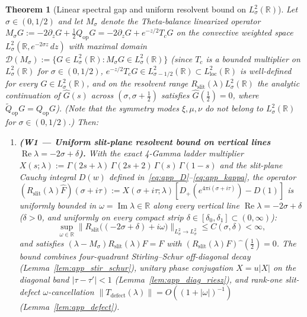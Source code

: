 \documentclass[11pt,a4paper]{article}
\newtheorem{thm}{Theorem}
\begin{document}
\begin{thm}[Linear spectral gap and uniform resolvent bound on $L^2_\sigma(\mathbb{R})$]
\label{thm:linear_gap}
Let $\sigma\in(0,1/2)$ and let $M_\sigma$ denote the Theta-balance linearized operator
$M_\sigma G := -2\partial_z G + \tfrac12 Q_{\mathrm{op}}G = -2\partial_z G + e^{-z/2}T_c G$
on the convective weighted space $L^2_\sigma(\mathbb{R}, e^{-2\sigma z}\,dz)$ with maximal domain
$\mathcal{D}(M_\sigma) := \{G\in L^2_\sigma(\mathbb{R}) : M_\sigma G\in L^2_\sigma(\mathbb{R})\}$
(since $T_c$ is a bounded multiplier on $L^2_\sigma(\mathbb{R})$ for $\sigma\in(0,1/2)$,
$e^{-z/2}T_c G\in L^2_{\sigma-1/2}(\mathbb{R})\subset L^2_{\mathrm{loc}}(\mathbb{R})$ is well-defined for every
$G\in L^2_\sigma(\mathbb{R})$, and on the resolvent range $R_{\mathrm{slit}}(\lambda)L^2_\sigma(\mathbb{R})$
the analytic continuation of $\widehat{G}(s)$ across $(\sigma,\sigma+\tfrac12)$ satisfies
$\widehat{G}(\tfrac12)=0$, where $\widetilde{Q}_{\mathrm{op}}G=Q_{\mathrm{op}}G$).
(Note that the symmetry modes $\xi,\mu,\nu$ do not belong to $L^2_\sigma(\mathbb{R})$ for
$\sigma\in(0,1/2)$.)  Then:
\begin{enumerate}
\item \textbf{(W1 --- Uniform slit-plane resolvent bound on vertical lines $\operatorname{Re}\lambda = -2\sigma+\delta$).}
  With the exact 4-Gamma ladder multiplier
  $X(s;\lambda) := \Gamma(2s+\lambda)\,\Gamma(2s+2)\,\Gamma(s)\,\Gamma(1-s)$
  and the slit-plane Cauchy integral $D(w)$ defined in~\eqref{eq:app_D}--\eqref{eq:app_kappa},
  the operator
  $(R_{\mathrm{slit}}(\lambda)\widehat{F})(\sigma+i\tau) := X(\sigma+i\tau;\lambda)[D_+(e^{4\pi i(\sigma+i\tau)})-D(1)]$
  is uniformly bounded in $\omega=\operatorname{Im}\lambda\in\mathbb{R}$ along every vertical line
  $\operatorname{Re}\lambda = -2\sigma+\delta$ ($\delta>0$, and uniformly on every compact strip
  $\delta\in[\delta_0,\delta_1]\subset(0,\infty)$):
  \[
  \sup_{\omega\in\mathbb{R}}\bigl\|R_{\mathrm{slit}}\bigl((-2\sigma+\delta)+i\omega\bigr)\bigr\|_{L^2_\sigma\to L^2_\sigma}
  \le C(\sigma,\delta) < \infty,
  \]
  and satisfies $(\lambda-M_\sigma)R_{\mathrm{slit}}(\lambda)F = F$ with
  $(R_{\mathrm{slit}}(\lambda)F)\widehat{\phantom{a}}(\tfrac12)=0$.
  The bound combines four-quadrant Stirling--Schur off-diagonal decay (Lemma~\ref{lem:app_stir_schur}),
  unitary phase conjugation $X=u|X|$ on the diagonal band $|\tau-\tau'|<1$ (Lemma~\ref{lem:app_diag_riesz}),
  and rank-one slit-defect $\omega$-cancellation $\|T_{\mathrm{defect}}(\lambda)\|=O((1+|\omega|)^{-1})$
  (Lemma~\ref{lem:app_defect}).

\end{enumerate}
\end{thm}
\end{document}
